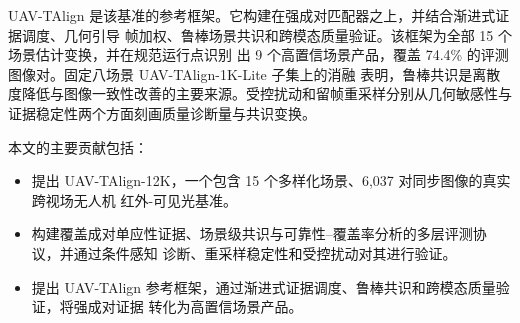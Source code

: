 UAV-TAlign 是该基准的参考框架。它构建在强成对匹配器之上，并结合渐进式证据调度、几何引导
帧加权、鲁棒场景共识和跨模态质量验证。该框架为全部 15 个场景估计变换，并在规范运行点识别
出 9 个高置信场景产品，覆盖 74.4\% 的评测图像对。固定八场景 UAV-TAlign-1K-Lite 子集上的消融
表明，鲁棒共识是离散度降低与图像一致性改善的主要来源。受控扰动和留帧重采样分别从几何敏感性与
证据稳定性两个方面刻画质量诊断量与共识变换。

本文的主要贡献包括：
\begin{itemize}
\item 提出 UAV-TAlign-12K，一个包含 15 个多样化场景、6,037 对同步图像的真实跨视场无人机
红外-可见光基准。
\item 构建覆盖成对单应性证据、场景级共识与可靠性--覆盖率分析的多层评测协议，并通过条件感知
诊断、重采样稳定性和受控扰动对其进行验证。
\item 提出 UAV-TAlign 参考框架，通过渐进式证据调度、鲁棒共识和跨模态质量验证，将强成对证据
转化为高置信场景产品。
\end{itemize}
